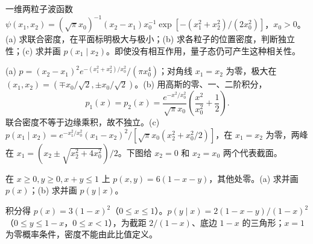 \begin{exercise}
一维两粒子波函数 $\psi(x_1,x_2)=(\sqrt\pi x_0)^{-1}(x_2-x_1)x_0^{-1}\exp[-(x_1^2+x_2^2)/(2x_0^2)]$，$x_0>0$。(a) 求联合密度，在平面标明极大与极小；(b) 求各粒子的位置密度，判断独立性；(c) 求并画 $p(x_1\mid x_2)$。即使没有相互作用，量子态仍可产生这种相关性。
\end{exercise}
\begin{solution}
(a) $p=(x_2-x_1)^2e^{-(x_1^2+x_2^2)/x_0^2}/(\pi x_0^4)$；对角线 $x_1=x_2$ 为零，极大在 $(x_1,x_2)=(\mp x_0/\sqrt2,\pm x_0/\sqrt2)$。(b) 用高斯的零、一、二阶积分，
\[p_1(x)=p_2(x)=\frac{e^{-x^2/x_0^2}}{\sqrt\pi x_0}\left(\frac{x^2}{x_0^2}+\frac12\right).\]
联合密度不等于边缘乘积，故不独立。(c) $p(x_1\mid x_2)=e^{-x_1^2/x_0^2}(x_1-x_2)^2/[\sqrt\pi x_0(x_2^2+x_0^2/2)]$，在 $x_1=x_2$ 为零，两峰在 $x_1=(x_2\pm\sqrt{x_2^2+4x_0^2})/2$。下图给 $x_2=0$ 和 $x_2=x_0$ 两个代表截面。
\end{solution}
\begin{center}\end{center}
\begin{center}\end{center}
\begin{exercise}
在 $x\ge0,y\ge0,x+y\le1$ 上 $p(x,y)=6(1-x-y)$，其他处零。(a) 求并画 $p(x)$；(b) 求并画 $p(y\mid x)$。
\end{exercise}
\begin{solution}
积分得 $p(x)=3(1-x)^2$（$0\le x\le1$）。$p(y\mid x)=2(1-x-y)/(1-x)^2$（$0\le y\le1-x$，$0\le x<1$），为截距 $2/(1-x)$、底边 $1-x$ 的三角形；$x=1$ 为零概率条件，密度不能由此比值定义。
\end{solution}
